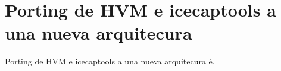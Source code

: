 \section{Porting de HVM e icecaptools a una nueva arquitecura} \label{sec:portingHvm}

Porting de HVM e icecaptools a una nueva arquitecura é.
